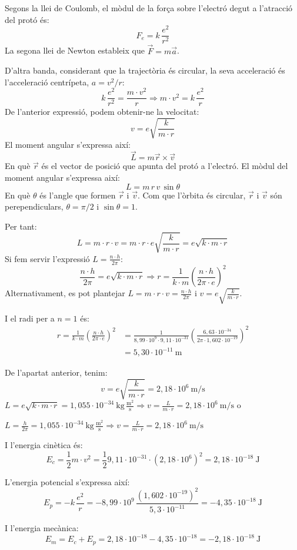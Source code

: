 \begin{solapartat}
 Segons la llei de Coulomb, el mòdul de la força sobre l'electró degut a l'atracció del protó és:
\[ F_e = k\,\frac{e^2}{r^2} \]
La segona llei de Newton estableix que $\vec{F} = m\vec{a}$.

D'altra banda, considerant que la trajectòria és circular, la seva acceleració és l'acceleració centrípeta, $a = v^2/r$:
\[ k\,\frac{e^2}{r^2} = \frac{m\cdot v^2}{r} \Rightarrow m\cdot v^2 = k\,\frac{e^2}{r} \]
De l'anterior expressió, podem obtenir-ne la velocitat:
\[ v = e\sqrt{\frac{k}{m\cdot r}} \]
 El moment angular s'expressa així:
\[ \vec{L} = m\vec{r}\times\vec{v} \]
En què $\vec{r}$ és el vector de posició que apunta del protó a l'electró. El mòdul del moment angular s'expressa així:
\[ L = m\,r\,v\,\sin\theta \]
En què $\theta$ és l'angle que formen $\vec{r}$ i $\vec{v}$. Com que l'òrbita és circular, $\vec{r}$ i $\vec{v}$ són perependiculars, $\theta = \pi/2$ i $\sin\theta = 1$.

Per tant:
\[ L = m\cdot r\cdot v = m\cdot r\cdot e\sqrt{\frac{k}{m\cdot r}} = e\sqrt{k\cdot m\cdot r} \]
 Si fem servir l'expressió $L = \frac{n\cdot h}{2\pi}$:
\[ \frac{n\cdot h}{2\pi} = e\sqrt{k\cdot m\cdot r} \Rightarrow r = \frac{1}{k\cdot m}\left(\frac{n\cdot h}{2\pi\cdot e}\right)^2 \]
Alternativament, es pot plantejar $L = m\cdot r\cdot v = \frac{n\cdot h}{2\pi}$ i $v = e\sqrt{\frac{k}{m\cdot r}}$.

 I el radi per a $n = 1$ és:
\begin{align*}
r = \frac{1}{k\cdot m}\left(\frac{n\cdot h}{2\pi\cdot e}\right)^2
&= \frac{1}{8,99\cdot 10^{9}\cdot 9,11\cdot 10^{-31}}\left(\frac{6,63\cdot 10^{-34}}{2\pi\cdot 1,602\cdot 10^{-19}}\right)^2\\
&= 5,30\cdot 10^{-11}\ \mathrm{m}
\end{align*}
\end{solapartat}

\begin{solapartat}
De l'apartat anterior, tenim:
\[ v = e\sqrt{\frac{k}{m\cdot r}} = 2,18\cdot 10^{6}\ \mathrm{m/s} \]
 $L = e\sqrt{k\cdot m\cdot r} = 1,055\cdot 10^{-34}\ \mathrm{kg}\,\frac{\mathrm{m^2}}{\mathrm{s}} \Rightarrow v = \frac{L}{m\cdot r} = 2,18\cdot 10^{6}\ \mathrm{m/s}$ o

$L = \frac{h}{2\pi} = 1,055\cdot 10^{-34}\ \mathrm{kg}\,\frac{\mathrm{m^2}}{\mathrm{s}} \Rightarrow v = \frac{L}{m\cdot r} = 2,18\cdot 10^{6}\ \mathrm{m/s}$

 I l'energia cinètica és:
\[ E_c = \frac{1}{2}m\cdot v^2 = \frac{1}{2}9,11\cdot 10^{-31}\cdot (2,18\cdot 10^{6})^2 = 2,18\cdot 10^{-18}\ \mathrm{J} \]

 L'energia potencial s'expressa així:
\[ E_p = -k\,\frac{e^2}{r} = -8,99\cdot 10^{9}\,\frac{(1,602\cdot 10^{-19})^2}{5,3\cdot 10^{-11}} = -4,35\cdot 10^{-18}\ \mathrm{J} \]

 I l'energia mecànica:
\[ E_m = E_c + E_p = 2,18\cdot 10^{-18} - 4,35\cdot 10^{-18} = -2,18\cdot 10^{-18}\ \mathrm{J} \]
\end{solapartat}

